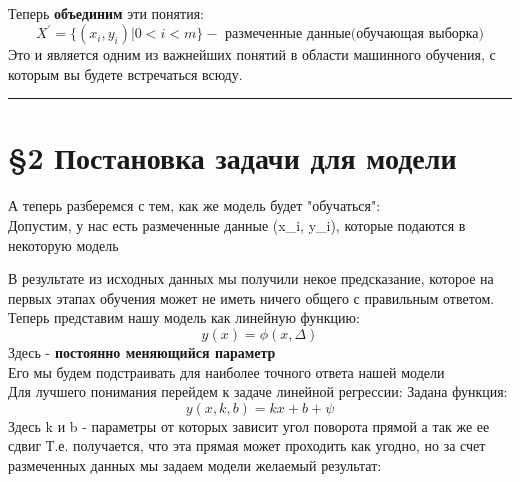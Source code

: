 \documentclass[a4paper,12pt]{article} %
\begin{document}
    \centering
    \vspace{1cm}
    Теперь \textbf{объединим} эти понятия:
    \[
        X^{'} = \{(x_i, y_i ) | 0 < i < m\} - \textbf{ размеченные данные(обучающая выборка)}
    \]
    Это и является одним из важнейших понятий в области машинного обучения, с которым вы будете встречаться всюду.
\noindent\rule{\linewidth}{0.4pt}

    \newpage
    \centering
    \section*{\S 2 Постановка задачи для модели}
    \vspace{1em}
\raggedright
    А теперь разберемся с тем, как же модель будет "обучаться": \\
    \vspace{0.8cm}
    Допустим, у нас есть размеченные данные (x_i, y_i), которые подаются в некоторую модель

\usetikzlibrary{shapes.geometric, arrows.meta}



\begin{center}
\end{center}

В результате из исходных данных мы получили некое предсказание, которое на первых этапах обучения может не иметь ничего общего с правильным ответом. \\
\vspace{1cm}
    Теперь представим нашу модель как линейную функцию:
    \[y(x) = \phi (x, \Delta)\]
    Здесь \Delta - \textbf{постоянно меняющийся параметр} \\
    Его мы будем подстраивать для наиболее точного ответа нашей модели \\
    \vspace{1cm}
    Для лучшего понимания перейдем к задаче линейной регрессии:
    Задана функция:
    \[
        y(x, k, b) = kx + b + \psi
    \]
    Здесь k и b - параметры от которых зависит угол поворота прямой а так же ее сдвиг
    Т.е. получается, что эта прямая может проходить как угодно, но за счет размеченных данных мы задаем модели желаемый результат:
\end{document}
